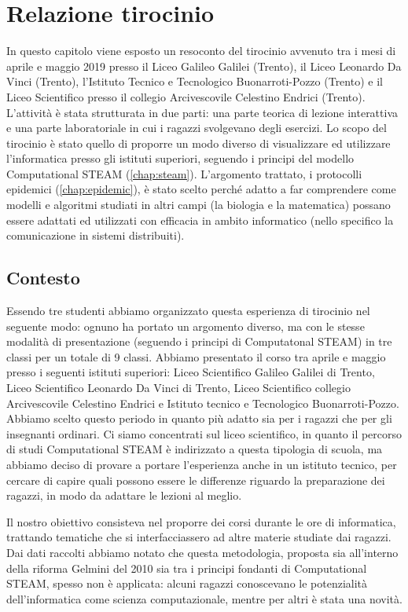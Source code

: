 \newpage
\chapter{Relazione tirocinio}
\label{cha:tirocinio}
In questo capitolo viene esposto un resoconto del tirocinio avvenuto tra i mesi di aprile e maggio 2019 presso il Liceo Galileo Galilei (Trento), il Liceo Leonardo Da Vinci (Trento), l’Istituto Tecnico e Tecnologico Buonarroti-Pozzo (Trento) e il Liceo Scientifico presso il collegio Arcivescovile Celestino Endrici (Trento). L’attività è stata strutturata in due parti: una parte teorica di lezione interattiva e una parte laboratoriale in cui i ragazzi svolgevano degli esercizi. Lo scopo del tirocinio è stato quello di proporre un modo diverso di visualizzare ed utilizzare l’informatica presso gli istituti superiori, seguendo i principi del modello Computational STEAM (\autoref{chap:steam}). L’argomento trattato, i protocolli epidemici (\autoref{chap:epidemic}), è stato scelto perché adatto a far comprendere come modelli e algoritmi studiati in altri campi (la biologia e la matematica) possano essere adattati ed utilizzati con efficacia in ambito informatico (nello specifico la comunicazione in sistemi distribuiti).
\section{Contesto}
Essendo tre studenti abbiamo organizzato questa esperienza di tirocinio nel seguente modo: ognuno ha portato un argomento diverso, ma con le stesse modalità di presentazione (seguendo i principi di Computatonal STEAM) in tre classi per un totale di 9 classi.
Abbiamo presentato il corso tra aprile e maggio presso i seguenti istituti superiori: Liceo Scientifico Galileo Galilei di Trento, Liceo Scientifico Leonardo Da Vinci di Trento, Liceo Scientifico collegio Arcivescovile Celestino Endrici e Istituto tecnico e Tecnologico Buonarroti-Pozzo. Abbiamo scelto questo periodo in quanto più adatto sia per i ragazzi che per gli insegnanti ordinari. Ci siamo concentrati sul liceo scientifico, in quanto il percorso di studi Computational STEAM è indirizzato a questa tipologia di scuola, ma abbiamo deciso di provare a portare l’esperienza anche in un istituto tecnico, per cercare di capire quali possono essere le differenze riguardo la preparazione dei ragazzi, in modo da adattare le lezioni al meglio. 

Il nostro obiettivo consisteva nel proporre dei corsi durante le ore di informatica, trattando tematiche che si interfacciassero ad altre materie studiate dai ragazzi. Dai dati raccolti abbiamo notato che questa metodologia, proposta sia all'interno della riforma Gelmini del 2010 \cite{riforma} sia tra i principi fondanti di Computational STEAM, spesso non è applicata: alcuni ragazzi conoscevano le potenzialità dell'informatica come scienza computazionale, mentre per altri è stata una novità. 

